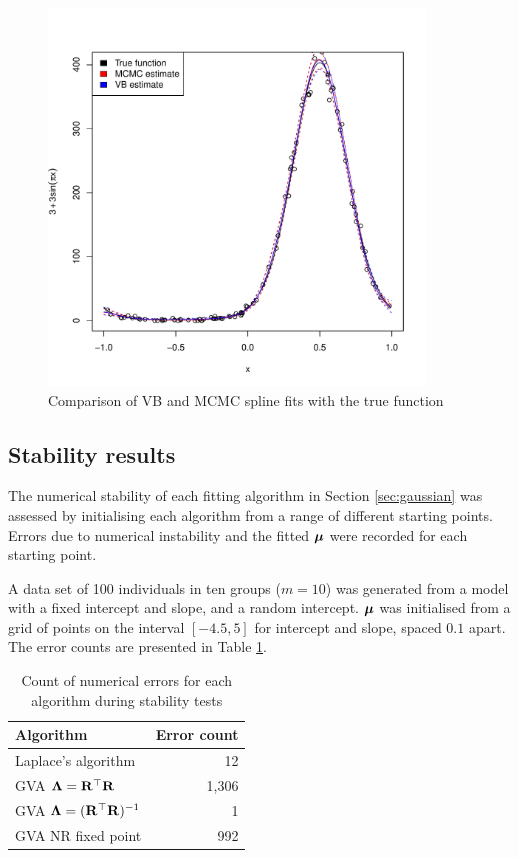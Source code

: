 \documentclass{amsart}[12pt]
\begin{document}
	\begin{figure}
		\label{fig:spline}
		\caption{Comparison of VB and MCMC spline fits with the true function}
		\includegraphics[width=100mm, height=100mm]{code/results/accuracy_plots_spline_gva2.pdf}
	\end{figure}
		
		
	\subsection{Stability results}
		
	The numerical stability of each fitting algorithm in Section \ref{sec:gaussian} was assessed by initialising
	each algorithm from a range of different starting points. Errors due to numerical instability and the fitted
	${\boldsymbol \mu}$ were recorded for each starting point.
		
	A data set of 100 individuals in ten groups ($m=10$) was generated from a model with a fixed intercept and
	slope, and a random intercept. ${\boldsymbol \mu}$ was initialised from a grid of points on the interval $[-4.5, 5]$ for
	intercept and slope, spaced $0.1$ apart. The error counts are presented in Table
	\ref{tab:stability_results}.
		
	\begin{table}
		\caption{Count of numerical errors for each algorithm during stability tests}
		\label{tab:stability_results}
		\begin{tabular}{|l|r|}
			\hline
			Algorithm           & Error count \\
			\hline
			Laplace's algorithm & 12          \\
			GVA ${\boldsymbol \Lambda} = {\bf R}^\top {\bf R}$                 & 1,306       \\
			GVA ${\boldsymbol \Lambda} = ({\bf R}^\top {\bf R})^{-1}$              & 1         \\
			GVA NR fixed point              & 992         \\
			\hline
		\end{tabular}
	\end{table}
		
\end{document}
